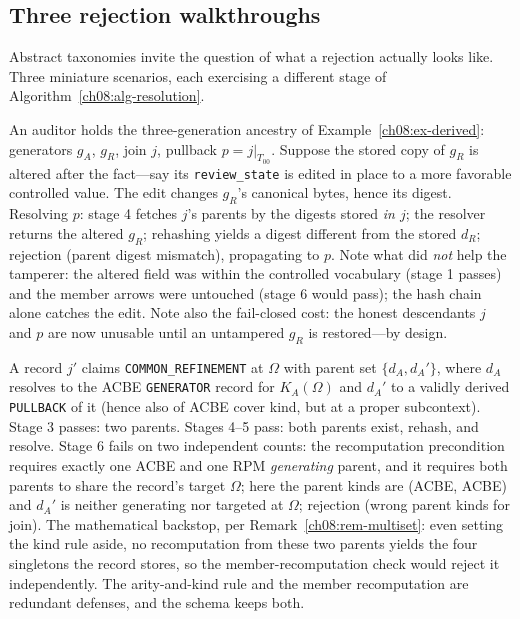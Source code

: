 \subsection{Three rejection walkthroughs}\label{ch08:sec-walkthroughs}

Abstract taxonomies invite the question of what a rejection actually looks like. Three miniature scenarios, each exercising a different stage of Algorithm~\ref{ch08:alg-resolution}.

\begin{example}\label{ch08:ex-tamper}
An auditor holds the three-generation ancestry of Example~\ref{ch08:ex-derived}: generators $g_{A}$, $g_{R}$, join $j$, pullback $p=j|_{T_{00}}$. Suppose the stored copy of $g_{R}$ is altered after the fact---say its \texttt{review\_state} is edited in place to a more favorable controlled value. The edit changes $g_{R}$'s canonical bytes, hence its digest. Resolving $p$: stage 4 fetches $j$'s parents by the digests stored \emph{in $j$}; the resolver returns the altered $g_{R}$; rehashing yields a digest different from the stored $d_{R}$; rejection (parent digest mismatch), propagating to $p$. Note what did \emph{not} help the tamperer: the altered field was within the controlled vocabulary (stage 1 passes) and the member arrows were untouched (stage 6 would pass); the hash chain alone catches the edit. Note also the fail-closed cost: the honest descendants $j$ and $p$ are now unusable until an untampered $g_{R}$ is restored---by design.
\end{example}

\begin{example}\label{ch08:ex-launder}
A record $j'$ claims \texttt{COMMON\_REFINEMENT} at $\Omega$ with parent set $\{d_{A},d_{A}'\}$, where $d_{A}$ resolves to the ACBE \texttt{GENERATOR} record for $K_{A}(\Omega)$ and $d_{A}'$ to a validly derived \texttt{PULLBACK} of it (hence also of ACBE cover kind, but at a proper subcontext). Stage 3 passes: two parents. Stages 4--5 pass: both parents exist, rehash, and resolve. Stage 6 fails on two independent counts: the recomputation precondition requires exactly one ACBE and one RPM \emph{generating} parent, and it requires both parents to share the record's target $\Omega$; here the parent kinds are (ACBE, ACBE) and $d_{A}'$ is neither generating nor targeted at $\Omega$; rejection (wrong parent kinds for join). The mathematical backstop, per Remark~\ref{ch08:rem-multiset}: even setting the kind rule aside, no recomputation from these two parents yields the four singletons the record stores, so the member-recomputation check would reject it independently. The arity-and-kind rule and the member recomputation are redundant defenses, and the schema keeps both.
\end{example}

